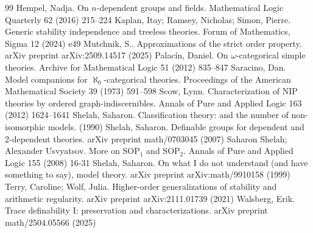 \documentclass[10pt,a4paper]{amsart}
\begin{document}
\begin{thebibliography}{99}
 Hempel, Nadja. On $n$-dependent groups and fields. Mathematical Logic Quarterly 62 (2016) 215--224
 Kaplan, Itay; Ramsey, Nicholas; Simon, Pierre. Generic stability independence and treeless theories. Forum of Mathematics, Sigma 12 (2024) e49
 Mutchnik, S.. Approximations of the strict order property. arXiv preprint arXiv:2509.14517 (2025)
 Palac{\'i}n, Daniel. On $\omega$-categorical simple theories. Archive for Mathematical Logic 51 (2012) 835--847
 Saracino, Dan. Model companions for $\aleph_0$-categorical theories. Proceedings of the American Mathematical Society 39 (1973) 591--598
 Scow, Lynn. Characterization of {NIP} theories by ordered graph-indiscernibles. Annals of Pure and Applied Logic 163 (2012) 1624--1641
 Shelah, Saharon. Classification theory: and the number of non-isomorphic models. (1990)
 Shelah, Saharon. Definable groups for dependent and 2-dependent theories. arXiv preprint math/0703045 (2007)
 Saharon Shelah; Alexander Usvyatsov. More on $\mathrm{SOP}_{1}$ and $\mathrm{SOP}_{2}$. Annals of Pure and Applied Logic 155 (2008) 16-31
 Shelah, Saharon. On what I do not understand (and have something to say), model theory. arXiv preprint arXiv:math/9910158 (1999)
 Terry, Caroline; Wolf, Julia. Higher-order generalizations of stability and arithmetic regularity. arXiv preprint arXiv:2111.01739 (2021)
 Walsberg, Erik. Trace definability {I}: preservation and characterizations. arXiv preprint math/2504.05566 (2025)
\end{thebibliography}
\end{document}
